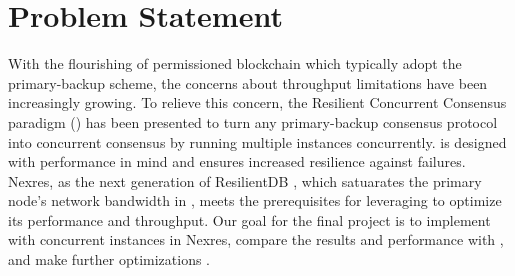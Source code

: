 \section{Problem Statement}
\par With the flourishing of permissioned blockchain which typically adopt the primary-backup scheme, 
the concerns about throughput limitations have been increasingly growing. To relieve this concern, the Resilient 
Concurrent Consensus paradigm (\RCC{}) \cite{rcc} has been presented to turn any primary-backup consensus protocol into concurrent 
consensus by running multiple instances concurrently. \RCC{} is designed with performance in mind and ensures increased 
resilience against failures. Nexres, as the next generation of ResilientDB \cite{gupta2020resilientdb, rahnama2020scalable}, which satuarates 
the primary node's network bandwidth in \PBFT{} \cite{pbft}, meets the prerequisites for leveraging \RCC{} to optimize its performance 
and throughput. Our goal for the final project is to implement \RCC{} with concurrent \PBFT{} instances in Nexres, compare 
the results and performance with \PBFT{}, and make further optimizations .